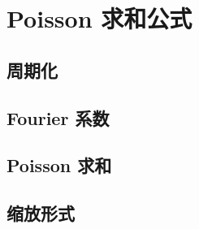 \section{Poisson 求和公式}
\label{b2:sec:0601}


\subsection{周期化}
\label{b2:subsec:060101}

\subsection{Fourier 系数}
\label{b2:subsec:060102}

\subsection{Poisson 求和}
\label{b2:subsec:060103}

\subsection{缩放形式}
\label{b2:subsec:060104}


